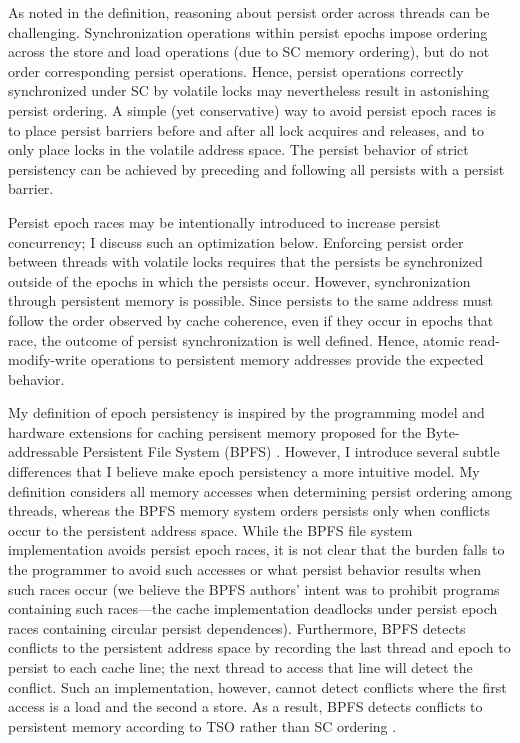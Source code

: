 As noted in the definition, reasoning about persist order across threads can be challenging.
Synchronization operations within persist epochs impose ordering across the store and load operations (due to SC memory ordering), but do not order corresponding persist operations.
Hence, persist operations correctly synchronized under SC by volatile locks may nevertheless result in astonishing persist ordering.
A simple (yet conservative) way to avoid persist epoch races is to place persist barriers before and after all lock acquires and releases, and to only place locks in the volatile address space.
The persist behavior of strict persistency can be achieved by preceding and following all persists with a persist barrier.

Persist epoch races may be intentionally introduced to increase persist concurrency; I discuss such an optimization below.
Enforcing persist order between threads with volatile locks requires that the persists be synchronized outside of the epochs in which the persists occur.
However, synchronization through persistent memory is possible.
Since persists to the same address must follow the order observed by cache coherence, even if they occur in epochs that race, the outcome of persist synchronization is well defined.
Hence, atomic read-modify-write operations to persistent memory addresses provide the expected behavior.

My definition of epoch persistency is inspired by the programming model and hardware extensions for caching persisent memory proposed for the Byte-addressable Persistent File System (BPFS) \cite{ConditNightingale09}.
However, I introduce several subtle differences that I believe make epoch persistency a more intuitive model.
My definition considers all memory accesses when determining persist ordering among threads, whereas the BPFS memory system orders persists only when conflicts occur to the persistent address space.
While the BPFS file system implementation avoids persist epoch races, it is not clear that the burden falls to the programmer to avoid such accesses or what persist behavior results when such races occur (we believe the BPFS authors' intent was to prohibit programs containing such races---the cache implementation deadlocks under persist epoch races containing circular persist dependences).  
Furthermore, BPFS detects conflicts to the persistent address space by recording the last thread and epoch to persist to each cache line; the next thread to access that line will detect the conflict.
Such an implementation, however, cannot detect conflicts where the first access is a load and the second a store.
As a result, BPFS detects conflicts to persistent memory according to TSO rather than SC ordering \cite{SPARCv9}.

